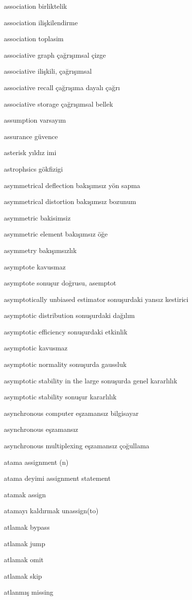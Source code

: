 \documentclass[12pt,fleqn]{article}\usepackage{../../common}
\begin{document}
association birliktelik

association ilişkilendirme

association toplasim

associative graph çağrışımsal çizge

associative ilişkili, çağrışımsal

associative recall çağrışıma dayalı çağrı

associative storage çağrışımsal bellek

assumption varsayım

assurance güvence

asterisk yıldız imi

astrophsics gökfizigi

asymmetrical deflection bakışımsız yön sapma

asymmetrical distortion bakışımsız bozunum

asymmetric bakisimsiz

asymmetric element bakışımsız öğe

asymmetry bakışımsızlık

asymptote kavusmaz

asymptote sonuşur doğrusu, asemptot

asymptotically unbiased estimator sonuşurdaki yansız kestirici

asymptotic distribution sonuşurdaki dağılım

asymptotic efficiency sonuşurdaki etkinlik

asymptotic kavusmaz

asymptotic normality sonuşurda gaussluk

asymptotic stability in the large sonuşurda genel kararlılık

asymptotic stability sonuşur kararlılık

asynchronous computer eşzamansız bilgisayar

asynchronous eşzamansız

asynchronous multiplexing eşzamansız çoğullama

atama assignment (n)

atama deyimi assignment statement

atamak assign

atamayı kaldırmak unassign(to)

atlamak bypass

atlamak jump

atlamak omit

atlamak skip

atlanmış missing
\end{document}
